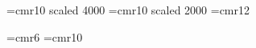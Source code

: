 \font\titlerm		=cmr10	scaled	4000 %
\font\subtitlerm	=cmr10	scaled	2000 %
\font\twelverm		=cmr12

\font\sixrm			=cmr6
\font\tenrm			=cmr10
